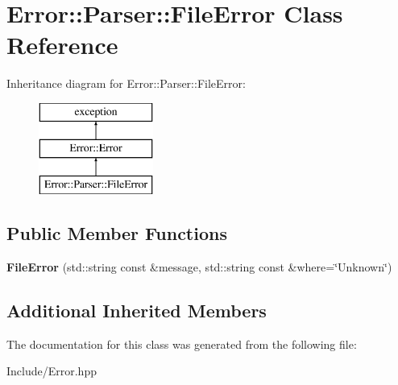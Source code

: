 \hypertarget{classError_1_1Parser_1_1FileError}{}\section{Error\+:\+:Parser\+:\+:File\+Error Class Reference}
\label{classError_1_1Parser_1_1FileError}
Inheritance diagram for Error\+:\+:Parser\+:\+:File\+Error\+:\begin{figure}[H]
\begin{center}
\leavevmode
\includegraphics[height=3.000000cm]{classError_1_1Parser_1_1FileError}
\end{center}
\end{figure}
\subsection*{Public Member Functions}
\begin{DoxyCompactItemize}
\item 
\mbox{\label{classError_1_1Parser_1_1FileError_af1ea2c413a42cd894245019510421481}} 
{\bfseries File\+Error} (std\+::string const \&message, std\+::string const \&where=\char`\"{}Unknown\char`\"{})
\end{DoxyCompactItemize}
\subsection*{Additional Inherited Members}


The documentation for this class was generated from the following file\+:\begin{DoxyCompactItemize}
\item 
Include/Error.\+hpp\end{DoxyCompactItemize}
